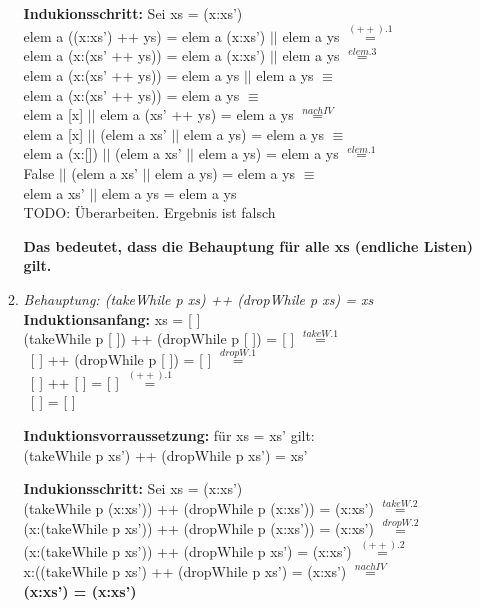 \documentclass[11pt]{article}
\begin{document}
\begin{enumerate}
\begin{enumerate}
\vspace*{0.5cm}
\textbf{Indukionsschritt:} Sei xs = (x:xs')\\
elem a ((x:xs') ++ ys) = elem a (x:xs') $||$ elem a ys $\stackrel{(++).1}{=}$\\
elem a (x:(xs' ++ ys)) = elem a (x:xs') $||$ elem a ys $\stackrel{elem.3}{=}$\\
elem a (x:(xs' ++ ys)) = elem a ys $||$ elem a ys $\equiv$\\
elem a (x:(xs' ++ ys)) = elem a ys $\equiv$\\
elem a [x] $||$ elem a (xs' ++ ys) = elem a ys $\stackrel{nach IV}{=}$\\
elem a [x] $||$ (elem a xs' $||$ elem a ys) = elem a ys $\equiv$\\
elem a (x:[]) $||$ (elem a xs' $||$ elem a ys) = elem a ys $\stackrel{elem.1}{=}$\\
False $||$ (elem a xs' $||$ elem a ys) = elem a ys $\equiv$\\
elem a xs' $||$ elem a ys = elem a ys\\

TODO: Überarbeiten. Ergebnis ist falsch


\vspace*{0.5cm}
\textbf{Das bedeutet, dass die Behauptung für alle xs (endliche Listen) gilt.}

\vspace*{0.5cm}
\item
\textit{Behauptung: (takeWhile p xs) ++ (dropWhile p xs) = xs}
\vspace*{0.5cm}
\newline
\textbf{Induktionsanfang:} xs = [ ]\\
(takeWhile p [ ]) ++ (dropWhile p [ ]) = [ ] $\stackrel{takeW.1}{=}$\\
\ [ ] ++ (dropWhile p [ ]) = [ ] $\stackrel{dropW.1}{=}$\\
\ [ ] ++ [ ] = [ ] $\stackrel{(++).1}{=}$\\
\ [ ] = [ ]


\vspace*{0.5cm}
\textbf{Induktionsvorraussetzung:} für xs = xs' gilt:\\
(takeWhile p xs') ++ (dropWhile p xs') = xs'

\vspace*{0.5cm}
\textbf{Indukionsschritt:} Sei xs = (x:xs')\\
(takeWhile p (x:xs')) ++ (dropWhile p (x:xs')) = (x:xs') $\stackrel{takeW.2}{=}$\\
(x:(takeWhile p xs')) ++ (dropWhile p (x:xs')) = (x:xs') $\stackrel{dropW.2}{=}$\\
(x:(takeWhile p xs')) ++ (dropWhile p xs') = (x:xs') $\stackrel{(++).2}{=}$\\
x:((takeWhile p xs') ++ (dropWhile p xs') = (x:xs') $\stackrel{nach IV}{=}$\\
\textbf{(x:xs') = (x:xs')}


\end{enumerate}
\end{enumerate}
\end{document}

